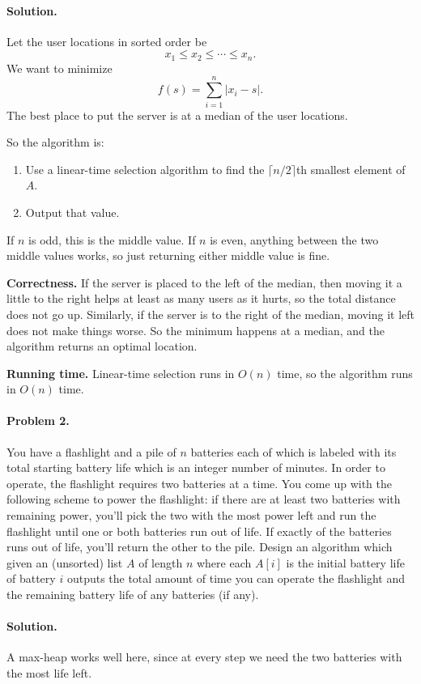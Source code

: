 \documentclass[10pt]{article}
\begin{document}
\paragraph{Solution.} Let the user locations in sorted order be
\[
x_1 \le x_2 \le \cdots \le x_n.
\]
We want to minimize
\[
f(s)=\sum_{i=1}^n |x_i-s|.
\]
The best place to put the server is at a median of the user locations.

So the algorithm is:
\begin{enumerate}
\item Use a linear-time selection algorithm to find the $\lceil n/2\rceil$th smallest element of $A$.
\item Output that value.
\end{enumerate}

If $n$ is odd, this is the middle value.  If $n$ is even, anything between the two middle values works, so just returning either middle value is fine.

\textbf{Correctness.} If the server is placed to the left of the median, then moving it a little to the right helps at least as many users as it hurts, so the total distance does not go up.  Similarly, if the server is to the right of the median, moving it left does not make things worse.  So the minimum happens at a median, and the algorithm returns an optimal location.

\textbf{Running time.} Linear-time selection runs in $O(n)$ time, so the algorithm runs in $O(n)$ time.

\paragraph{Problem 2.} You have a flashlight and a pile of $n$ batteries each of which is labeled with its total starting battery life which is an integer number of minutes.  In order to operate, the flashlight requires two batteries at a time.  You come up with the following scheme to power the flashlight:  if there are at least two batteries with remaining power, you'll pick the two with the most power left and run the flashlight until one or both batteries run out of life.  If exactly of the batteries runs out of life, you'll return the other to the pile.  Design an algorithm which given an (unsorted) list $A$ of length $n$ where each $A[i]$ is the initial battery life of battery $i$ outputs the total amount of time you can operate the flashlight and the remaining battery life of any batteries (if any).

\paragraph{Solution.} A max-heap works well here, since at every step we need the two batteries with the most life left.
\end{document}
